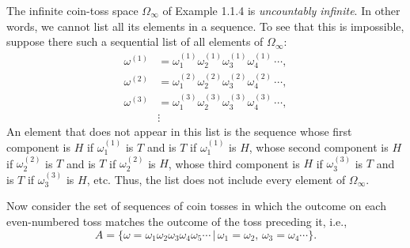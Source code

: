 \documentclass[11pt]{article}
\newcounter{question}[section]
\begin{document}
    \begin{hwquestion}
        The infinite coin-toss space $\Omega_{\infty}$ of Example 1.1.4 is \emph{uncountably
        infinite}. In other words, we cannot list all its elements in a sequence. To see
        that this is impossible, suppose there such a sequential list of all elements of
        $\Omega_{\infty}$:
        \[
            \begin{aligned}
                \omega^{(1)}
                &=
                \omega_{1}^{(1)}
                \omega_{2}^{(1)}
                \omega_{3}^{(1)}
                \omega_{4}^{(1)}
                \, \cdots, \\
                \omega^{(2)}
                &=
                \omega_{1}^{(2)}
                \omega_{2}^{(2)}
                \omega_{3}^{(2)}
                \omega_{4}^{(2)}
                \, \cdots, \\
                \omega^{(3)}
                &=
                \omega_{1}^{(3)}
                \omega_{2}^{(3)}
                \omega_{3}^{(3)}
                \omega_{4}^{(3)}
                \, \cdots, \\
                {}
                &\vdots
                {}
            \end{aligned}
        \]
        An element that does not appear in this list is the sequence whose first component
        is $H$ if $\omega_{1}^{(1)}$ is $T$ and is $T$ if $\omega_{1}^{(1)}$ is $H$, whose
        second component is $H$ if $\omega_{2}^{(2)}$ is $T$ and is $T$ if $\omega_{2}^{
        (2)}$ is $H$, whose third component is $H$ if $\omega_{3}^{(3)}$ is $T$ and is
        $T$ if $\omega_{3}^{(3)}$ is $H$, etc. Thus, the list does not include every element
        of $\Omega_{\infty}$.

        Now consider the set of sequences of coin tosses in which the outcome on each
        even-numbered toss matches the outcome of the toss preceding it, i.e.,
        \[
            A = \big\{
                \omega =
                \omega_1
                \omega_2
                \omega_3
                \omega_4
                \omega_5
                \cdots
                \, | \,
                \omega_1
                =
                \omega_2
                , \, 
                \omega_3
                =
                \omega_4
                \cdots
            \big\}.
        \]


\end{hwquestion}
\end{document}
